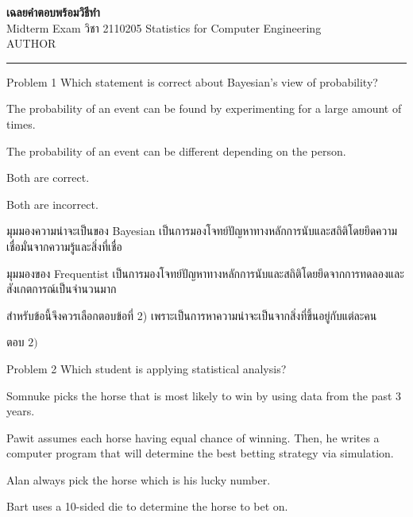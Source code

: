 \documentclass[11pt]{scrartcl}
\newcommand{\groupctx}[2]{\bigskip\noindent\textbf{Questions #1.} \textit{#2}\par\medskip}
\begin{document}
\begin{center}
{\LARGE\bfseries เฉลยคำตอบพร้อมวิธีทำ}\\[4pt]
{\large Midterm Exam วิชา 2110205 Statistics for Computer Engineering}\\[2pt]
{AUTHOR}
\end{center}

\bigskip
\hrule
\bigskip


\bigskip


\begin{problembox}{Problem 1}
Which statement is correct about Bayesian's view of probability?

\begin{choices}
\item The probability of an event can be found by experimenting for a large amount of times.
\item The probability of an event can be different depending on the person.
\item Both are correct.
\item Both are incorrect.
\end{choices}
\end{problembox}

\begin{solutionbox}
  มุมมองความน่าจะเป็นของ Bayesian เป็นการมองโจทย์ปัญหาทางหลักการนับและสถิติโดยยึดความเชื่อมั่นจากความรู้และสิ่งที่เชื่อ
  
  มุมมองของ Frequentist เป็นการมองโจทย์ปัญหาทางหลักการนับและสถิติโดยยึดจากการทดลองและสังเกตการณ์เป็นจำนวนมาก
  
  สำหรับข้อนี้จึงควรเลือกตอบข้อที่ 2) เพราะเป็นการหาความน่าจะเป็นจากสิ่งที่ขึ้นอยู่กับแต่ละคน

  ตอบ $\boxed{2)}$
\end{solutionbox}

\begin{problembox}{Problem 2}
Which student is applying statistical analysis?

\begin{choices}
\item Somnuke picks the horse that is most likely to win by using data from the past 3 years.
\item Pawit assumes each horse having equal chance of winning. Then, he writes a computer program that will determine the best betting strategy via simulation.
\item Alan always pick the horse which is his lucky number.
\item Bart uses a 10-sided die to determine the horse to bet on.
\end{choices}
\end{problembox}
\end{document}
